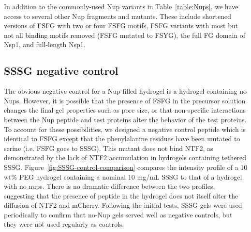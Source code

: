 In addition to the commonly-used Nup variants in Table~\ref{table:Nups}, we have access to several other Nup fragments and mutants.  These include shortened versions of FSFG with two or four FSFG motifs, FSFG variants with most but not all binding motifs removed (FSFG mutated to FSYG), the full FG domain of Nsp1, and full-length Nsp1.

\subsection{SSSG negative control}
\label{sec:SSSG}

The obvious negative control for a Nup-filled hydrogel is a hydrogel containing no Nups. However, it is possible that the presence of FSFG in the precursor solution changes the final gel properties such as pore size, or that non-specific interactions between the Nup peptide and test proteins alter the behavior of the test proteins.  To account for these possibilities, we designed a negative control peptide which is identical to FSFG except that the phenylalanine residues have been mutated to serine (i.e. FSFG goes to SSSG).  This mutant does not bind NTF2, as demonstrated by the lack of NTF2 accumulation in hydrogels containing tethered SSSG. Figure~\ref{fig:SSSG-control-comparison} compares the intensity profile of a 10 wt\% PEG hydrogel containing a nominal 10 mg/mL SSSG to that of a hydrogel with no nups.  There is no dramatic difference between the two profiles, suggesting that the presence of peptide in the hydrogel does not itself alter the diffusion of NTF2 and mCherry.  Following the initial tests, SSSG gels were used periodically to confirm that no-Nup gels served well as negative controls, but they were not used regularly as controls.

